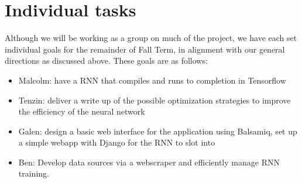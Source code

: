 \section{Individual tasks}\label{sec:indiv}
Although we will be working as a group on much of the project, we have each set
individual goals for the remainder of Fall Term, in alignment with our general
directions as discussed above. These goals are as follows:
\begin{itemize}
  \item Malcolm: have a RNN that compiles and runs to completion in Tensorflow
  \item Tenzin: deliver a write up of the possible optimization strategies to improve the efficiency of the neural network
  \item Galen: design a basic web interface for the application using Balsamiq,
        set up a simple webapp with Django for the RNN to slot into
  \item Ben: Develop data sources via a webscraper and efficiently manage RNN
  training.
\end{itemize}
